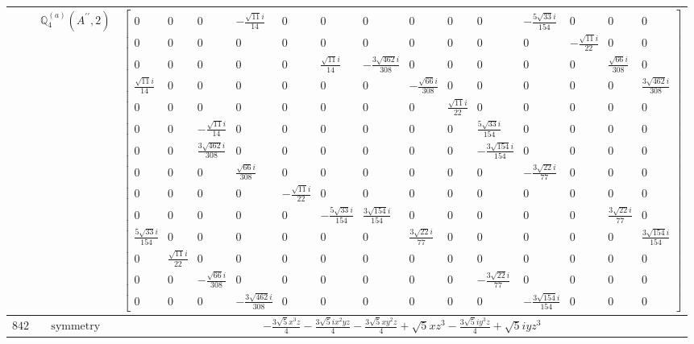 \documentclass[fleqn,8pt,landscape]{jsarticle}
\begin{document}
\begin{longtable}{ccc}
$  $ & $ \mathbb{Q}_{4}^{(a)}(A^{\prime\prime},2) $ & $ \begin{bmatrix} 0 & 0 & 0 & - \frac{\sqrt{11} i}{14} & 0 & 0 & 0 & 0 & 0 & 0 & - \frac{5 \sqrt{33} i}{154} & 0 & 0 & 0 \\ 0 & 0 & 0 & 0 & 0 & 0 & 0 & 0 & 0 & 0 & 0 & - \frac{\sqrt{11} i}{22} & 0 & 0 \\ 0 & 0 & 0 & 0 & 0 & \frac{\sqrt{11} i}{14} & - \frac{3 \sqrt{462} i}{308} & 0 & 0 & 0 & 0 & 0 & \frac{\sqrt{66} i}{308} & 0 \\ \frac{\sqrt{11} i}{14} & 0 & 0 & 0 & 0 & 0 & 0 & - \frac{\sqrt{66} i}{308} & 0 & 0 & 0 & 0 & 0 & \frac{3 \sqrt{462} i}{308} \\ 0 & 0 & 0 & 0 & 0 & 0 & 0 & 0 & \frac{\sqrt{11} i}{22} & 0 & 0 & 0 & 0 & 0 \\ 0 & 0 & - \frac{\sqrt{11} i}{14} & 0 & 0 & 0 & 0 & 0 & 0 & \frac{5 \sqrt{33} i}{154} & 0 & 0 & 0 & 0 \\ 0 & 0 & \frac{3 \sqrt{462} i}{308} & 0 & 0 & 0 & 0 & 0 & 0 & - \frac{3 \sqrt{154} i}{154} & 0 & 0 & 0 & 0 \\ 0 & 0 & 0 & \frac{\sqrt{66} i}{308} & 0 & 0 & 0 & 0 & 0 & 0 & - \frac{3 \sqrt{22} i}{77} & 0 & 0 & 0 \\ 0 & 0 & 0 & 0 & - \frac{\sqrt{11} i}{22} & 0 & 0 & 0 & 0 & 0 & 0 & 0 & 0 & 0 \\ 0 & 0 & 0 & 0 & 0 & - \frac{5 \sqrt{33} i}{154} & \frac{3 \sqrt{154} i}{154} & 0 & 0 & 0 & 0 & 0 & \frac{3 \sqrt{22} i}{77} & 0 \\ \frac{5 \sqrt{33} i}{154} & 0 & 0 & 0 & 0 & 0 & 0 & \frac{3 \sqrt{22} i}{77} & 0 & 0 & 0 & 0 & 0 & \frac{3 \sqrt{154} i}{154} \\ 0 & \frac{\sqrt{11} i}{22} & 0 & 0 & 0 & 0 & 0 & 0 & 0 & 0 & 0 & 0 & 0 & 0 \\ 0 & 0 & - \frac{\sqrt{66} i}{308} & 0 & 0 & 0 & 0 & 0 & 0 & - \frac{3 \sqrt{22} i}{77} & 0 & 0 & 0 & 0 \\ 0 & 0 & 0 & - \frac{3 \sqrt{462} i}{308} & 0 & 0 & 0 & 0 & 0 & 0 & - \frac{3 \sqrt{154} i}{154} & 0 & 0 & 0 \end{bmatrix} $ \\ \hline
$ 842 $ & $ \text{symmetry} $ & $ - \frac{3 \sqrt{5} x^{3} z}{4} - \frac{3 \sqrt{5} i x^{2} y z}{4} - \frac{3 \sqrt{5} x y^{2} z}{4} + \sqrt{5} x z^{3} - \frac{3 \sqrt{5} i y^{3} z}{4} + \sqrt{5} i y z^{3} $ \\

\end{longtable}
\end{document}
